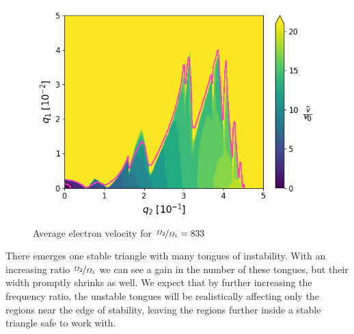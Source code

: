 \begin{figure}[H]
	\centering
	\includegraphics[width=\linewidth]{img/0_ions_1_electrons_q1_0.0-0.05_q2_0.0-0.5_640x640_13_1000.png}
	\caption{Average electron velocity for $\nicefrac{\Omega_2}{\Omega_1} = 833$}
	\label{fig:stabil-eta=13}
\end{figure}

There emerges one stable triangle with many tongues of instability. With an increasing ratio $\nicefrac{\Omega_2}{\Omega_1}$ we can see a gain in the number of these tongues, but their width promptly shrinks as well. We expect that by further increasing the frequency ratio, the unstable tongues will be realistically affecting only the regions near the edge of stability, leaving the regions further inside a stable triangle safe to work with.


